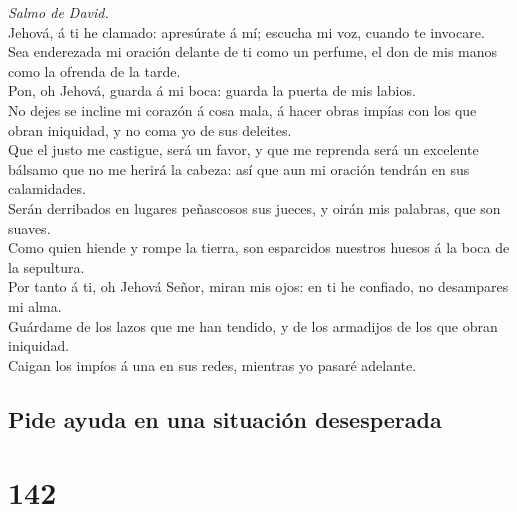  \emph{Salmo de David.}\\
Jehová, á ti he clamado: apresúrate á mí; escucha mi voz, cuando te
invocare.\\
 Sea enderezada mi oración delante de ti como un perfume, el
don de mis manos como la ofrenda de la tarde.\\
 Pon, oh Jehová, guarda á mi boca: guarda la puerta de mis
labios.\\
 No dejes se incline mi corazón á cosa mala, á hacer obras
impías con los que obran iniquidad, y no coma yo de sus deleites.\\
 Que el justo me castigue, será un favor, y que me reprenda
será un excelente bálsamo que no me herirá la cabeza: así que aun mi
oración tendrán en sus calamidades.\\
 Serán derribados en lugares peñascosos sus jueces, y oirán
mis palabras, que son suaves.\\
 Como quien hiende y rompe la tierra, son esparcidos
nuestros huesos á la boca de la sepultura.\\
 Por tanto á ti, oh Jehová Señor, miran mis ojos: en ti he
confiado, no desampares mi alma.\\
 Guárdame de los lazos que me han tendido, y de los
armadijos de los que obran iniquidad.\\
 Caigan los impíos á una en sus redes, mientras yo pasaré
adelante.

\hypertarget{pide-ayuda-en-una-situaciuxf3n-desesperada}{%
\subsection{Pide ayuda en una situación
desesperada}\label{pide-ayuda-en-una-situaciuxf3n-desesperada}}

\hypertarget{section-141}{%
\section{142}\label{section-141}}

